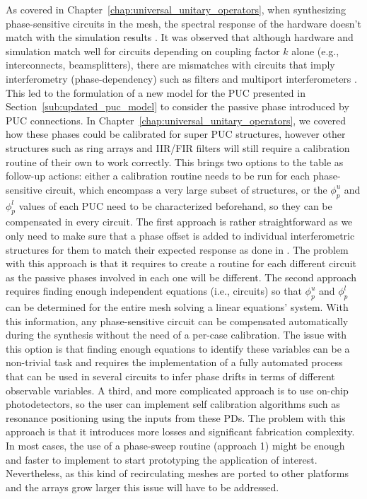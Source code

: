As covered in Chapter~\ref{chap:universal_unitary_operators}, when synthesizing phase-sensitive circuits in the mesh, the spectral response of the hardware doesn't match with the simulation results \cite{on_programmable_2024,sanchez_gomariz_scalability_2024}.
It was observed that although hardware and simulation match well for circuits depending on coupling factor \( k\) alone (e.g., interconnects, beamsplitters), there are mismatches with circuits that imply interferometry (phase-dependency) such as filters and multiport interferometers \cite{zand_effects_2020}.
This led to the formulation of a new model for the PUC presented in Section~\ref{sub:updated_puc_model} to consider the passive phase introduced by PUC connections.
In Chapter~\ref{chap:universal_unitary_operators}, we covered how these phases could be calibrated for super PUC structures, however other structures such as ring arrays and IIR/FIR filters will still require a calibration routine of their own to work correctly.
This brings two options to the table as follow-up actions: either a calibration routine needs to be run for each phase-sensitive circuit, which encompass a very large subset of structures, or the \(\phi^u_p\) and \(\phi^l_p\) values of each PUC need to be characterized beforehand, so they can be compensated in every circuit.
The first approach is rather straightforward as we only need to make sure that a phase offset is added to individual interferometric structures for them to match their expected response as done in \cite{on_programmable_2024}.
The problem with this approach is that it requires to create a routine for each different circuit as the passive phases involved in each one will be different.
The second approach requires finding enough independent equations (i.e., circuits) so that \(\phi^u_p\) and \(\phi^l_p\) can be determined for the entire mesh solving a linear equations' system.
With this information, any phase-sensitive circuit can be compensated automatically during the synthesis without the need of a per-case calibration.
The issue with this option is that finding enough equations to identify these variables can be a non-trivial task and requires the implementation of a fully automated process that can be used in several circuits to infer phase drifts in terms of different observable variables.
A third, and more complicated approach is to use on-chip photodetectors, so the user can implement self calibration algorithms such as resonance positioning using the inputs from these PDs.
The problem with this approach is that it introduces more losses and significant fabrication complexity.
In most cases, the use of a phase-sweep routine (approach 1) might be enough and faster to implement to start prototyping the application of interest.
Nevertheless, as this kind of recirculating meshes are ported to other platforms \cite{kim_programmable_2023,zhang_compact_2024,zhang_programmable_2025} and the arrays grow larger this issue will have to be addressed.

